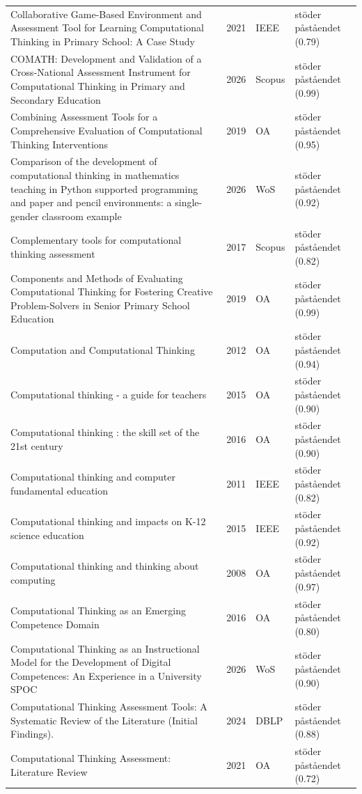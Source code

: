 \begin{longtable}{@{}%
  >{\raggedright\arraybackslash}p{}c%
  >{\raggedright\arraybackslash}p{}%
  >{\raggedright\arraybackslash}p{}@{}}
Collaborative Game-Based Environment and Assessment Tool for Learning Computational Thinking in Primary School: A Case Study & 2021 & IEEE & stöder påståendet (0.79) \\
COMATH: Development and Validation of a Cross-National Assessment Instrument for Computational Thinking in Primary and Secondary Education & 2026 & Scopus & stöder påståendet (0.99) \\
Combining Assessment Tools for a Comprehensive Evaluation of Computational Thinking Interventions & 2019 & OA & stöder påståendet (0.95) \\
Comparison of the development of computational thinking in mathematics teaching in Python supported programming and paper and pencil environments: a single-gender classroom example & 2026 & WoS & stöder påståendet (0.92) \\
Complementary tools for computational thinking assessment & 2017 & Scopus & stöder påståendet (0.82) \\
Components and Methods of Evaluating Computational Thinking for Fostering Creative Problem-Solvers in Senior Primary School Education & 2019 & OA & stöder påståendet (0.99) \\
Computation and Computational Thinking & 2012 & OA & stöder påståendet (0.94) \\
Computational thinking - a guide for teachers & 2015 & OA & stöder påståendet (0.90) \\
Computational thinking : the skill set of the 21st century & 2016 & OA & stöder påståendet (0.90) \\
Computational thinking and computer fundamental education & 2011 & IEEE & stöder påståendet (0.82) \\
Computational thinking and impacts on K-12 science education & 2015 & IEEE & stöder påståendet (0.92) \\
Computational thinking and thinking about computing & 2008 & OA & stöder påståendet (0.97) \\
Computational Thinking as an Emerging Competence Domain & 2016 & OA & stöder påståendet (0.80) \\
Computational Thinking as an Instructional Model for the Development of Digital Competences: An Experience in a University SPOC & 2026 & WoS & stöder påståendet (0.90) \\
Computational Thinking Assessment Tools: A Systematic Review of the Literature (Initial Findings). & 2024 & DBLP & stöder påståendet (0.88) \\
Computational Thinking Assessment: Literature Review & 2021 & OA & stöder påståendet (0.72) \\

\end{longtable}
